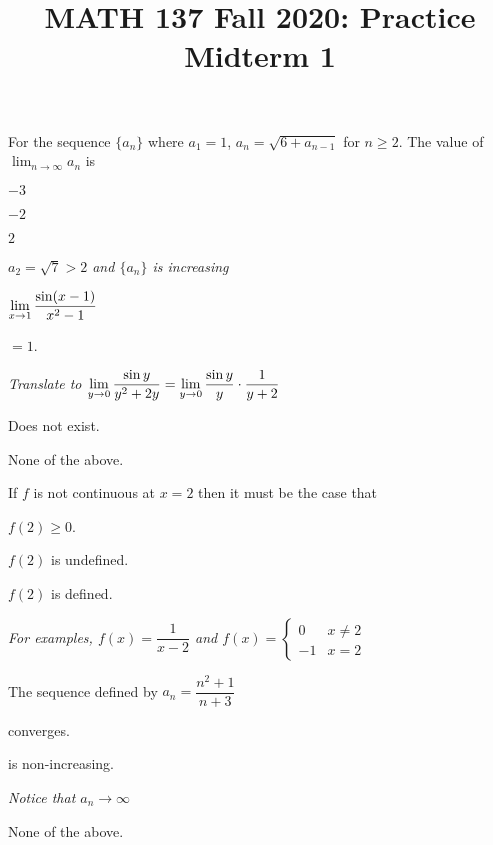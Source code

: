 
\title{MATH 137 Fall 2020: Practice Midterm 1}


\thispagestyle{firstpage}

\textbf{\@title}


\question For the sequence $\{a_n\}$ where $a_1=1$, $a_n=\sqrt{6+a_{n-1}}$ for $n \geq 2$.
The value of $\lim_{n\to\infty} a_n$ is
\begin{choices}
  \item $-3$
  \item $-2$
  \item $2$
  \item {}
  \emph{$a_2=\sqrt{7}>2$ and $\{a_n\}$ is increasing}
\end{choices}

\question $\displaystyle\lim_{x\to1} \frac{\sin(x-1)}{x^2-1}$
\begin{choices}
  \item $=1$.
  \item {}
  \emph{Translate to $\displaystyle\lim_{y\to0}\frac{\sin y}{y^2+2y}=\displaystyle\lim_{y\to0}\frac{\sin y}{y}\cdot\frac{1}{y+2}$}
  \item Does not exist.
  \item None of the above.
\end{choices}

\question If $f$ is not continuous at $x=2$ then it must be the case that
\begin{choices}
  \item $f(2) \geq 0$.
  \item $f(2)$ is undefined.
  \item $f(2)$ is defined.
  \item {}
  \emph{For examples, $f(x)=\dfrac{1}{x-2}$ and $f(x)=\begin{cases}
        0 & x \neq 2 \\ -1 & x = 2
      \end{cases}$}
\end{choices}

\question The sequence defined by $a_n = \dfrac{n^2+1}{n+3}$
\begin{choices}
  \item converges.
  \item is non-increasing.
  \item {}
  \emph{Notice that $a_n\to\infty$}
  \item None of the above.
\end{choices}

